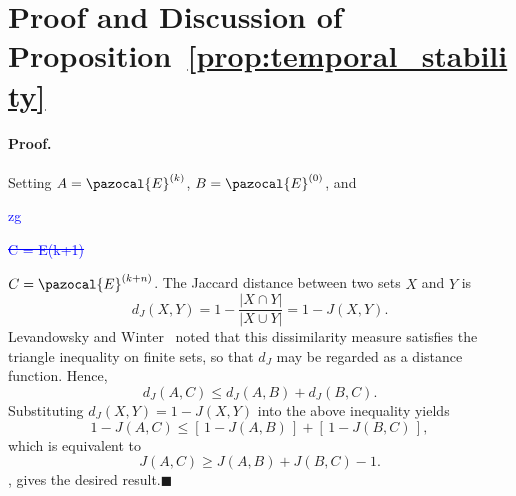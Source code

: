 \documentclass[a4paper,fleqn]{cas-sc}
\newcommand{\stkout}[1]{\ifmmode\text{\sout{\ensuremath{#1}}}\else\sout{#1}\fi}
\newcommand\rev[3]{\textcolor{blue}{\begin{scriptsize}{#1}\end{scriptsize}\stkout{#2}}\textcolor{red}{#3}}
\newcommand\rev[3]{\ignorespaces#3\ignorespaces\unskip}
\begin{document}





\printcredits

%






\newpage
\appendix


\section{Proof and Discussion of Proposition~\ref{prop:temporal_stability}}
\label{app:temporal_stability_proof}

\paragraph{Proof.}
Setting $A=\pazocal{E}^{(k)}$, $B=\pazocal{E}^{(0)}$, and \rev{zg}{C = E(k+1)}{$C=\pazocal{E}^{(k+n)}$}.
The Jaccard distance between two sets $X$ and $Y$ is
\[
d_J(X,Y)=1-\frac{|X\cap Y|}{|X\cup Y|}=1-J(X,Y).
\]
Levandowsky and Winter~\citep{levandowsky1971distance} noted that this
dissimilarity measure satisfies the triangle inequality on finite sets,
so that $d_J$ may be regarded as a distance function. Hence,
\[
d_J(A,C)\le d_J(A,B)+d_J(B,C).
\]
Substituting $d_J(X,Y)=1-J(X,Y)$ into the above inequality yields
\[
1-J(A,C)
\le [\,1-J(A,B)\,]+[\,1-J(B,C)\,],
\]
which is equivalent to
\[
J(A,C)\ge J(A,B)+J(B,C)-1.
\]
, gives the desired result.\hfill$\blacksquare$
\end{document}
